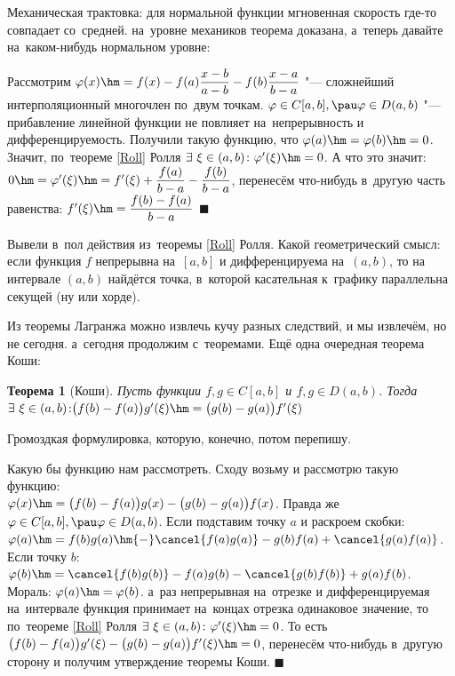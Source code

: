 \documentclass[a4paper,10pt,twoside]{article}
\newtheorem{The}{Теорема}[section]
\newenvironment{Proof}
       {\par\noindent{\textbf{Доказательство.}}}
       {\hfill$\scriptstyle\blacksquare$}
\begin{document}
Механическая трактовка: для нормальной функции мгновенная скорость где-то совпадает со~средней. на~уровне механиков теорема доказана, а~теперь давайте на~каком-нибудь нормальном уровне:

\begin{Proof}
    Рассмотрим $\varphi(x)\hm=f(x)-f(a)\dfrac{x-b}{a-b}-f(b)\dfrac{x-a}{b-a}$ "--- сложнейший интерполяционный многочлен по~двум точкам.
    $\varphi\in C[a,b],\pau \varphi\in D(a,b)$ "--- прибавление линейной функции не повлияет на~непрерывность и дифференцируемость. Получили
    такую функцию, что $\varphi(a)\hm=\varphi(b)\hm=0$. Значит, по~теореме \ref{Roll} Ролля $\exists\ \xi\in(a,b)\colon \varphi'(\xi)\hm=0$. А
    что это значит: $0\hm=\varphi'(\xi)\hm=f'(\xi)+\dfrac{f(a)}{b-a}-\dfrac{f(b)}{b-a}$, перенесём что-нибудь в~другую часть равенства:
    $f'(\xi)\hm=\dfrac{f(b)-f(a)}{b-a}$
\end{Proof}

Вывели в~пол действия из~теоремы \ref{Roll} Ролля. Какой геометрический смысл: если функция $f$ непрерывна на~$[a,b]$ и дифференцируема на~$(a,b)$, то
на интервале $(a,b)$ найдётся точка, в~которой касательная к~графику параллельна секущей (ну или хорде).


Из теоремы Лагранжа можно извлечь кучу разных следствий, и мы извлечём, но не сегодня. а~сегодня продолжим с~теоремами.
Ещё одна очередная теорема Коши:

\begin{The}[Коши]\label{Kohi}
    Пусть функции $f,g\in C[a,b]$ и $f,g\in D(a,b)$. Тогда $\exists\ \xi\in(a,b)\colon\\ \big(f(b)-f(a)\big)g'(\xi)\hm={\big(g(b)-g(a)\big)f'(\xi)}$
\end{The}

Громоздкая формулировка, которую, конечно, потом перепишу.

\begin{Proof}
    Какую бы функцию нам рассмотреть. Сходу возьму и рассмотрю такую функцию:\\
    $\varphi(x)\hm=\big(f(b)-f(a)\big)g(x)-\big(g(b)-g(a)\big)f(x)$. Правда же $\varphi\in C[a,b],\pau \varphi\in D(a,b)$. Если подставим точку
    $a$ и раскроем скобки: $\varphi(a)\hm=f(b)g(a)\hm{-}\cancel{f(a)g(a)}-g(b)f(a)+\cancel{g(a)f(a)}$. Если точку $b$: $
    \varphi(b)\hm=\cancel{f(b)g(b)}-f(a)g(b)-\cancel{g(b)f(b)}+g(a)f(b)$. Мораль: $\varphi(a)\hm=\varphi(b)$.
    а~раз непрерывная на~отрезке и дифференцируемая на~интервале функция принимает на~концах отрезка одинаковое значение, то по~теореме \ref{Roll} Ролля
    $\exists\ \xi\in(a,b)\colon \varphi'(\xi)\hm=0$. То есть
    $\big(f(b)-f(a)\big)g'(\xi)-\big(g(b)-g(a)\big)f'(\xi)\hm=0$, перенесём что-нибудь в~другую сторону и получим утверждение теоремы Коши.
\end{Proof}
\end{document}
